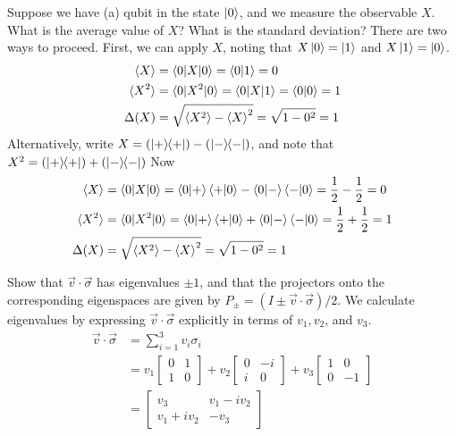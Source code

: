  Suppose we have (a) qubit in the state $\ket{0}$, and we  measure the observable $X$.  What is the average value of $X$?  What is the standard deviation?
\Soln There are two ways to proceed.  First, we can apply $X$, noting that $X\ket{0}=\ket{1}$ and $X\ket{1} = \ket{0}$. 
\begin{align*}
	\braket{X} &= \braket{0 | X | 0} = \braket{0 | 1} = 0\\
	\braket{X^2} &= \braket{0 | X^2 | 0} = \braket{0 | X | 1} =\braket{0 | 0} = 1\\
	\Delta(X) &= \sqrt{ \braket{X^2} - \braket{X}^2 } = \sqrt{1-0^2} = 1
\end{align*}
Alternatively, write $X = (\ket{+}\hspace{-1mm} \bra{+})-(\ket{-}\hspace{-1mm} \bra{-})$, and note that $X^2 = (\ket{+}\hspace{-1mm} \bra{+})+(\ket{-}\hspace{-1mm} \bra{-})$ Now
\begin{align*}
	\braket{X} &= \braket{0 | X | 0} = \braket{0|+}\braket{+|0} - \braket{0|-}\braket{-|0}=\frac{1}{2}-\frac{1}{2} = 0\\
	\braket{X^2} &= \braket{0 | X^2 | 0} = \braket{0|+}\braket{+|0} + \braket{0|-}\braket{-|0}=\frac{1}{2}+\frac{1}{2} = 1\\
	\Delta(X)  &= \sqrt{ \braket{X^2} - \braket{X}^2 } = \sqrt{1 - 0^2} = 1
\end{align*}



  Show that $\vec{v}\cdot\vec{\sigma}$ has eigenvalues $\pm1$, and that the projectors onto the corresponding eigenspaces are given by $P_\pm = (I\pm\vec{v}\cdot\vec{\sigma})/2$.
\Soln We calculate eigenvalues by expressing $\vec{v}\cdot\vec{\sigma}$ explicitly in terms of $v_1,v_2$, and $v_3$.
\begin{align*}
    \vec{v} \cdot \vec{\sigma} &= \sum_{i=1}^3 v_i \sigma_i \tag{definition}\\
    &= v_1 \begin{bmatrix}
        0 & 1 \\
        1 & 0
    \end{bmatrix}
    + v_2 \begin{bmatrix}
        0 & -i \\
        i & 0
    \end{bmatrix}
    + v_3 \begin{bmatrix}
        1 & 0 \\
        0 & -1
    \end{bmatrix} \tag{$\sigma_1=X, \sigma_2=Y, \sigma_3=Z$}\\
    &= \begin{bmatrix}
        v_3 & v_1 - i v_2 \\
        v_1 + iv_2 & -v_3
    \end{bmatrix} \tag{add corresponding entries}
\end{align*}

